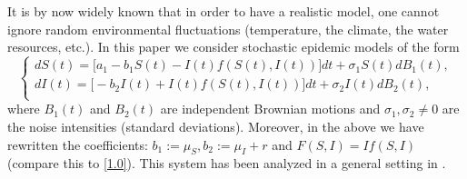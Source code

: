 \documentclass[12pt]{amsart}
\theoremstyle{remark}
\numberwithin{equation}{section}
\numberwithin{equation}{section}
\newcommand{\1}{\boldsymbol{1}}
\begin{document}
It is by now widely known that in order
to have
a realistic model, one cannot ignore random environmental fluctuations (temperature, the climate, the water resources, etc.). In this paper we consider stochastic epidemic models of the form
\begin{equation}\label{e:unhid}
\begin{cases}
dS(t)=\big[a_1-b_1S(t)-I(t)f(S(t),I(t))\big]dt + \sigma_1 S(t) dB_1(t),\\
dI(t)=\big[-b_2I(t) + I(t)f(S(t),I(t))\big]dt + \sigma_2I(t) dB_2(t),\\
\end{cases}
\end{equation}
where $B_1(t)$ and $B_2(t)$ are independent Brownian motions and $\sigma_1,\sigma_2\neq 0$ are the noise intensities (standard deviations).
Moreover, in the above we have rewritten the coefficients: $b_1:=\mu_S, b_2:=\mu_I+r$ and $F(S,I)=If(S,I)$ (compare this to \eqref{1.0}). This system has been analyzed in a
general setting in \cite{DN-JDE}.
\end{document}
